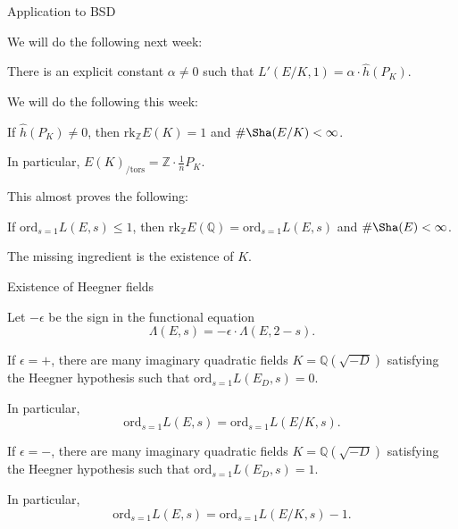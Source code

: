 \documentclass[10pt]{beamer}
\begin{document}
\begin{frame}[t]{Application to BSD}

We will do the following next week:

\begin{theorem}
There is an explicit constant $ \alpha \ne 0 $ such that $ L'(E / K, 1) = \alpha \cdot \widehat{h}(P_K) $.
\end{theorem}

\vspace{0.5cm} We will do the following this week:

\begin{theorem}[Kolyvagin '90]
If $ \widehat{h}(P_K) \ne 0 $, then $ \mathrm{rk}_\mathbb{Z} E(K) = 1 $ and $ \#\Sha(E / K) < \infty $.
\end{theorem}

In particular, $ E(K)_{/ \mathrm{tors}} = \mathbb{Z} \cdot \tfrac{1}{n}P_K $.

\vspace{0.5cm} This almost proves the following:

\begin{corollary}
If $ \mathrm{ord}_{s = 1} L(E, s) \le 1 $, then $ \mathrm{rk}_\mathbb{Z} E(\mathbb{Q}) = \mathrm{ord}_{s = 1} L(E, s) $ and $ \#\Sha(E) < \infty $.
\end{corollary}

The missing ingredient is the existence of $ K $.

\end{frame}

\begin{frame}[t]{Existence of Heegner fields}

Let $ -\epsilon $ be the sign in the functional equation
$$ \Lambda(E, s) = -\epsilon \cdot \Lambda(E, 2 - s). $$

\begin{theorem}
If $ \epsilon = + $, there are many imaginary quadratic fields $ K = \mathbb{Q}(\sqrt{-D}) $ satisfying the Heegner hypothesis such that $ \mathrm{ord}_{s = 1} L(E_D, s) = 0 $.
\end{theorem}

In particular,
$$ \mathrm{ord}_{s = 1} L(E, s) = \mathrm{ord}_{s = 1} L(E / K, s). $$

\begin{theorem}
If $ \epsilon = - $, there are many imaginary quadratic fields $ K = \mathbb{Q}(\sqrt{-D}) $ satisfying the Heegner hypothesis such that $ \mathrm{ord}_{s = 1} L(E_D, s) = 1 $.
\end{theorem}

In particular,
$$ \mathrm{ord}_{s = 1} L(E, s) = \mathrm{ord}_{s = 1} L(E / K, s) - 1. $$

\end{frame}
\end{document}
